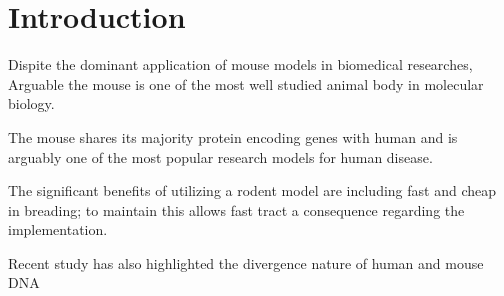\section{Introduction}

Dispite the dominant application of mouse models in biomedical researches, Arguable the mouse is one of the most well studied animal body in molecular biology. 

The mouse shares its majority protein encoding genes with human and is arguably one of the most popular research models for human disease. 


The significant benefits of utilizing a rodent model are including fast and cheap in breading; to maintain this allows fast tract a consequence regarding the implementation. \cite{Vandamme_2014}

Recent study has also highlighted the divergence nature of human and mouse DNA 